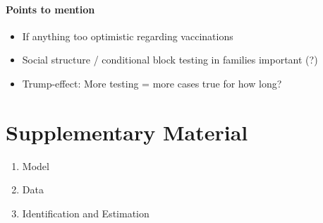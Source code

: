 \paragraph{Points to mention}
\begin{itemize}
    \item If anything too optimistic regarding vaccinations
    \item Social structure / conditional block testing in families important (?)
    \item Trump-effect: More testing = more cases true for how long?
\end{itemize}







\section{Supplementary Material}

\begin{enumerate}
    \item Model
    \item Data
    \item Identification and Estimation
\end{enumerate}
